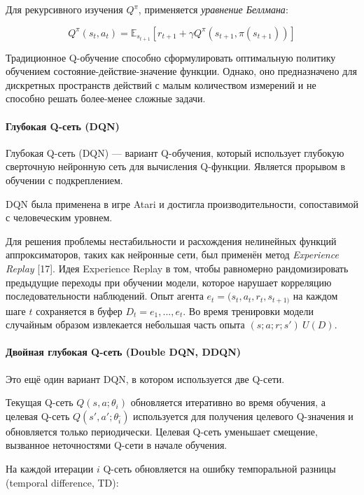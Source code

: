 Для рекурсивного изучения $Q^\pi$, применяется {\itshape уравнение Беллмана}:

\begin{equation} \label{eq:q-learning-bellmanEq}
Q^\pi(s_t, a_t) = \mathbb{E}_{s_{t+1}}[r_{t+1} + \gamma Q^\pi (s_{t+1}, \pi(s_{t+1}))]
\end{equation}

Традиционное Q-обучение способно сформулировать оптимальную политику обучением состояние-действие-значение функции. Однако, оно предназначено для дискретных пространств действий с малым количеством измерений и не способно решать более-менее сложные задачи.

\paragraph{Глубокая Q-сеть (DQN)}

Глубокая Q-сеть (DQN) --- вариант Q-обучения, который использует глубокую сверточную нейронную сеть для вычисления Q-функции. Является прорывом в обучении с подкреплением. \cite{bertsekas1996neuro}

DQN была применена в игре Atari и достигла производительности, сопоставимой с человеческим уровнем. \cite{Mnih2015}

Для решения проблемы нестабильности и расхождения нелинейных функций аппроксиматоров, таких как нейронные сети, был применён метод {\itshape Experience Replay} [17]. Идея Experience Replay в том, чтобы равномерно рандомизировать предыдущие переходы при обучении модели, которое нарушает корреляцию последовательности наблюдений. Опыт агента $e_t = (s_t, a_t, r_t, s_{t+1)}$ на каждом шаге $t$ сохраняется в буфер $D_t = {e_1, ..., e_t}$. Во время тренировки модели случайным образом извлекается небольшая часть опыта $(s; a; r; s') ~ U(D)$.

\paragraph{Двойная глубокая Q-сеть (Double DQN, DDQN)}

Это ещё один вариант DQN, в котором используется две Q-сети.

Текущая Q-сеть $Q(s, a; \theta_i)$ обновляется итеративно во время обучения, а целевая Q-сеть $Q(s', a'; \theta_i^\_)$ используется для получения целевого Q-значения и обновляется только периодически. Целевая Q-сеть уменьшает смещение, вызванное неточностями Q-сети в начале обучения.

На каждой итерации $i$ Q-сеть обновляется на ошибку темпоральной разницы (temporal difference, TD):

